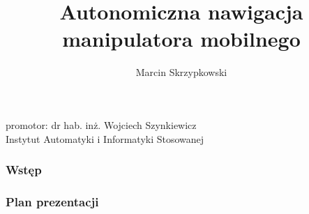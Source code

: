 \documentclass[aspectratio=169,11pt]{beamer}
\author{Marcin Skrzypkowski}
\title{Autonomiczna nawigacja manipulatora mobilnego}
\begin{document}
{
\begin{frame}
\titlepage
	\begin{center}
		promotor: dr hab. inż. Wojciech Szynkiewicz \\
		\small{Instytut Automatyki i Informatyki Stosowanej}
	\end{center}
\end{frame}
}

{
\begin{frame}
\frametitle{Wstęp}
	\begin{figure}[!tbp]
		\centering
  	\hfill
	\end{figure}
\end{frame}
}

{
\begin{frame}
\frametitle{Plan prezentacji}
	\begin{multicols}{2}
		\tableofcontents
	\end{multicols}
\end{frame}
}
\end{document}

